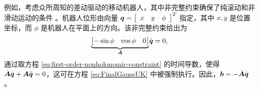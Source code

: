 例如，考虑众所周知的差动驱动的移动机器人，其中非完整约束确保了纯滚动和非滑动运动的条件 \cite{Fierro1997_}。机器人位形由向量 $\boldsymbol{q}=\left[\begin{array}{ccc}
x & y & \phi\end{array}\right]^{T}$ 指定，其中 $x,y$ 是位置坐标，而 $\phi$ 是机器人在平面上的方向。该非完整约束给出为
\begin{equation}
\underset{\boldsymbol{A}}{\underbrace{\begin{bmatrix}-\sin\phi & \cos\phi & 0\end{bmatrix}}}\dot{\boldsymbol{q}}=0,\label{eq:first-order-nonholonomic-constraint}
\end{equation}
通过取方程 \eqref{eq:first-order-nonholonomic-constraint} 的时间导数，使得 $\dot{\boldsymbol{A}}\dot{\boldsymbol{q}}+\boldsymbol{A}\ddot{\boldsymbol{q}}=0$，这可在方程 \eqref{eq:FinalGaussUK} 中被强制执行。因此，$\boldsymbol{b}=-\dot{\boldsymbol{A}}\dot{\boldsymbol{q}}$。
